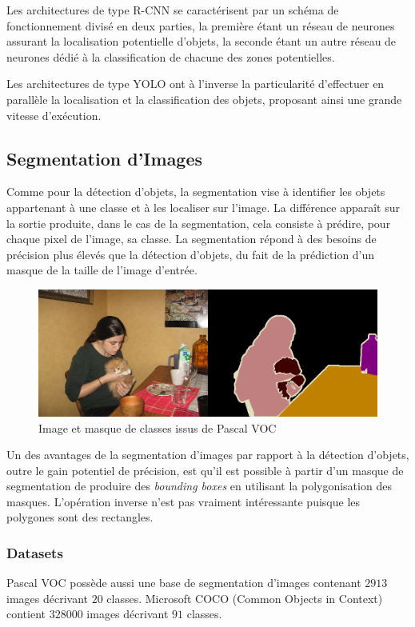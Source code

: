 \documentclass[a4paper, 11pt]{report}
\begin{document}
Les architectures de type R-CNN se caractérisent par un schéma de fonctionnement divisé en deux parties, la première étant un réseau de neurones assurant la localisation potentielle d'objets, la seconde étant un autre réseau de neurones dédié à la classification de chacune des zones potentielles.

Les architectures de type YOLO ont à l'inverse la particularité d'effectuer en parallèle la localisation et la classification des objets, proposant ainsi une grande vitesse d'exécution.
\subsection{Segmentation d'Images}
Comme pour la détection d'objets, la segmentation vise à identifier les objets appartenant à une classe et à les localiser sur l'image.
La différence apparaît sur la sortie produite, dans le cas de la segmentation, cela consiste à prédire, pour chaque pixel de l'image, sa classe.
La segmentation répond à des besoins de précision plus élevés que la détection d'objets, du fait de la prédiction d'un masque de la taille de l'image d'entrée.
\begin{figure}[H]
	\centering
	\includegraphics[scale=0.4]{Images/Pascal_VOC_Segmentation.png}
	\caption{Image et masque de classes issus de Pascal VOC}
\end{figure}
Un des avantages de la segmentation d'images par rapport à la détection d'objets, outre le gain potentiel de précision, est qu'il est possible à partir d'un masque de segmentation de produire des \emph{bounding boxes} en utilisant la polygonisation des masques. L'opération inverse n'est pas vraiment intéressante puisque les polygones sont des rectangles.
\subsubsection{Datasets}
Pascal VOC \citep{Everingham2010} possède aussi une base de segmentation d'images contenant $2913$ images décrivant $20$ classes.
Microsoft COCO (Common Objects in Context) \citep{Lin2014} contient $328000$ images décrivant $91$ classes.
\end{document}
